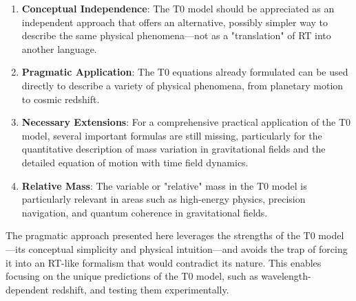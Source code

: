 \documentclass[12pt,a4paper]{article}
\begin{document}
	\begin{enumerate}
		\item \textbf{Conceptual Independence}: The T0 model should be appreciated as an independent approach that offers an alternative, possibly simpler way to describe the same physical phenomena—not as a "translation" of RT into another language.
		
		\item \textbf{Pragmatic Application}: The T0 equations already formulated can be used directly to describe a variety of physical phenomena, from planetary motion to cosmic redshift.
		
		\item \textbf{Necessary Extensions}: For a comprehensive practical application of the T0 model, several important formulas are still missing, particularly for the quantitative description of mass variation in gravitational fields and the detailed equation of motion with time field dynamics.
		
		\item \textbf{Relative Mass}: The variable or "relative" mass in the T0 model is particularly relevant in areas such as high-energy physics, precision navigation, and quantum coherence in gravitational fields.
	\end{enumerate}
	
	The pragmatic approach presented here leverages the strengths of the T0 model—its conceptual simplicity and physical intuition—and avoids the trap of forcing it into an RT-like formalism that would contradict its nature. This enables focusing on the unique predictions of the T0 model, such as wavelength-dependent redshift, and testing them experimentally.
	
\end{document}
